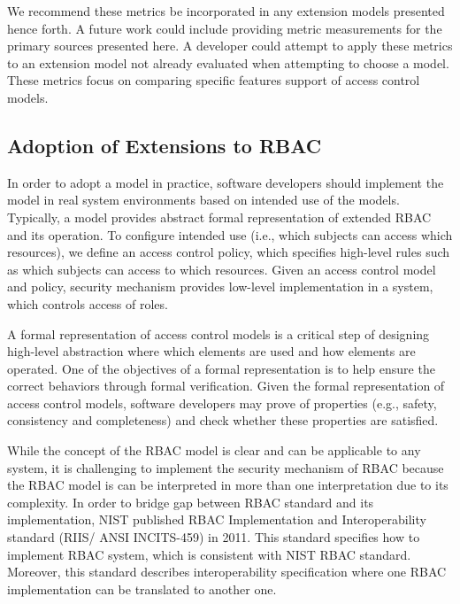 We recommend these metrics be incorporated in any extension models presented hence forth. A future work could include providing metric measurements for the primary sources presented here. 
A developer could attempt to apply these metrics to an extension model not already evaluated when attempting to choose a model. 
These metrics focus on comparing specific features support of access control models.


\subsection{Adoption of Extensions to RBAC}

In order to adopt a model in practice, software developers should implement the model in real system environments based on intended use of the models. Typically, a model provides abstract formal representation of extended RBAC and its operation. To configure intended use (i.e., which subjects can access which resources), we define an access control policy, which specifies high-level rules such as which subjects can access to which resources. Given an access control model and policy, security mechanism provides low-level implementation in a system, which controls access of roles.

A formal representation of access control models is a critical step of designing high-level abstraction where which elements are used and how elements are operated.
One of the objectives of a formal representation is to help ensure the correct behaviors through formal verification. Given the formal representation of access control models, software developers may prove of properties (e.g., safety, consistency and completeness) and check whether these properties are satisfied. 

While the concept of the RBAC model is clear and can be applicable to any system, it is challenging to implement the security mechanism of RBAC because the RBAC model is can be interpreted in more than one interpretation due to its complexity. In order to bridge gap between RBAC standard and its implementation, NIST published RBAC Implementation and Interoperability standard (RIIS/ ANSI INCITS-459) in 2011. This standard specifies how to implement RBAC system, which is consistent with NIST RBAC standard. Moreover, this standard describes interoperability specification where one RBAC implementation can be translated to another one.

